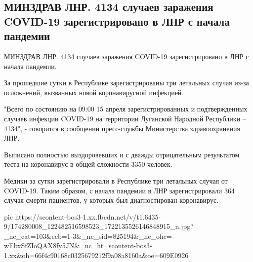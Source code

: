  
 
 
 
 

\subsection{МИНЗДРАВ ЛНР. 4134 случаев заражения COVID-19 зарегистрировано в ЛНР с начала пандемии}
\label{sec:15_04_2021.fb.respublikalnr.2.covid_stats}

МИНЗДРАВ ЛНР. 4134 случаев заражения COVID-19 зарегистрировано в ЛНР с начала пандемии.

За прошедшие сутки в Республике зарегистрированы три летальных случая из-за осложнений, вызванных новой коронавирусной инфекцией.

"Всего по состоянию на 09:00 15 апреля зарегистрированных и подтвержденных
случаев инфекции COVID-19 на территории Луганской Народной Республики – 4134",
- говорится в сообщении пресс-службы Министерства здравоохранения ЛНР.

Выписано полностью выздоровевших и с дважды отрицательным результатом теста на коронавирус в общей сложности 3350 человек.

Медики за сутки зарегистрировали в Республике три летальных случая от COVID-19.
Таким образом, с начала пандемии в ЛНР зарегистрировали 364 случая смерти
пациентов, у которых был диагностирован коронавирус.

\ifcmt
  pic https://scontent-bos3-1.xx.fbcdn.net/v/t1.6435-9/174280008_122482516598523_1722135526146848915_n.jpg?_nc_cat=103&ccb=1-3&_nc_sid=825194&_nc_ohc=-wEbxSfZIoQAX8fy5JN&_nc_ht=scontent-bos3-1.xx&oh=66f4c90168c0325679212f9a08a8160a&oe=609E0926
\fi


